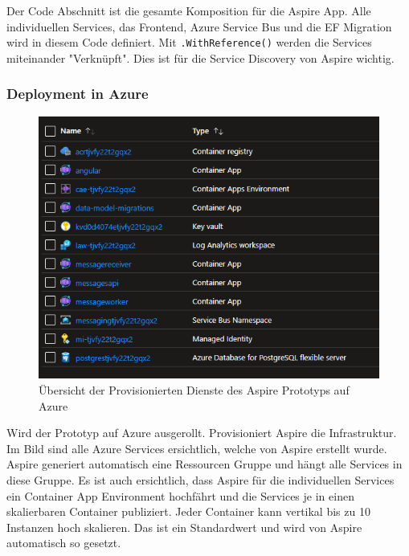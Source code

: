             Der Code Abschnitt ist die gesamte Komposition für die Aspire App. Alle individuellen Services, das Frontend, Azure Service Bus und die EF Migration wird in diesem Code definiert. Mit \verb|.WithReference()| werden die Services miteinander "Verknüpft". Dies ist für die Service Discovery von Aspire wichtig.

        \subsubsection{Deployment in Azure}
    
            \begin{figure}[ht]
                \centering
                \includegraphics[scale=0.6]{Ressources/Bilder/aspire-prototyp.azure-deplyoment.png}
                \caption{Übersicht der Provisionierten Dienste des Aspire Prototyps auf Azure}
                \label{fig:deployment}
            \end{figure}            
            
            Wird der Prototyp auf Azure ausgerollt. Provisioniert Aspire die Infrastruktur. Im Bild sind alle Azure Services ersichtlich, welche von Aspire erstellt wurde. Aspire generiert automatisch eine Ressourcen Gruppe und hängt alle Services in diese Gruppe. Es ist auch ersichtlich, dass Aspire für die individuellen Services ein Container App Environment hochfährt und die Services je in einen skalierbaren Container publiziert. Jeder Container kann vertikal bis zu 10 Instanzen hoch skalieren. Das ist ein Standardwert und wird von Aspire automatisch so gesetzt.
        \newpage

